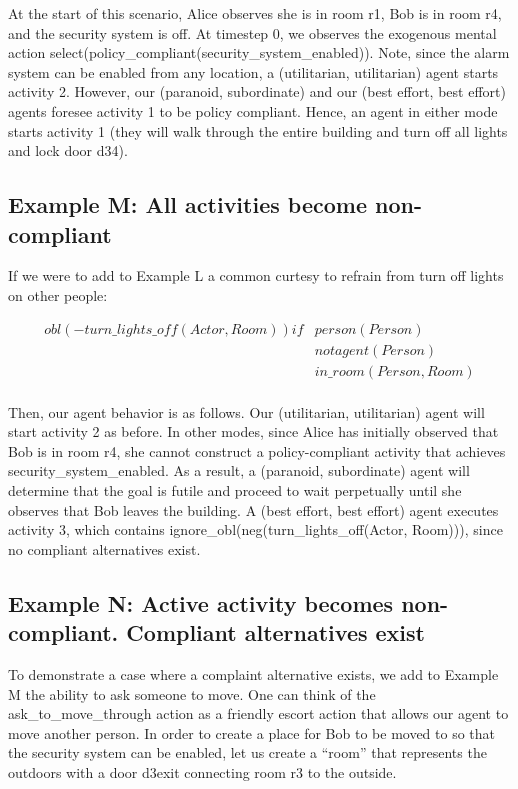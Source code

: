 At the start of this scenario, Alice observes she is in room r1, Bob is in room r4, and the security system is off.
At timestep 0, we observes the exogenous mental action select(policy\_compliant(security\_system\_enabled)).
Note, since the alarm system can be enabled from any location, a (utilitarian, utilitarian) agent starts activity 2.
However, our (paranoid, subordinate) and our (best effort, best effort) agents foresee activity 1 to be policy compliant.
Hence, an agent in either mode starts activity 1 (they will walk through the entire building and turn off all lights and lock door d34).

\subsection{Example M: All activities become non-compliant}

If we were to add to Example L a common curtesy to refrain from turn off lights on other people:

\begin{equation}
\begin{split}
obl(-turn\_lights\_off(Actor, Room)) if
    & person(Person) \\
    & not agent(Person) \\
    & in\_room(Person, Room) \\
\end{split}
\end{equation}

Then, our agent behavior is as follows.
Our (utilitarian, utilitarian) agent will start activity 2 as before.
In other modes, since Alice has initially observed that Bob is in room r4, she cannot construct a policy-compliant activity that achieves security\_system\_enabled.
As a result, a (paranoid, subordinate) agent will determine that the goal is futile and proceed to wait perpetually until she observes that Bob leaves the building.
A (best effort, best effort) agent executes activity 3, which contains ignore\_obl(neg(turn\_lights\_off(Actor, Room))), since no compliant alternatives exist.

\subsection{Example N: Active activity becomes non-compliant. Compliant alternatives exist}

To demonstrate a case where a complaint alternative exists, we add to Example M the ability to ask someone to move.
One can think of the ask\_to\_move\_through action as a friendly escort action that allows our agent to move another person.
In order to create a place for Bob to be moved to so that the security system can be enabled, let us create a “room” that represents the outdoors with a door d3exit connecting room r3 to the outside.

